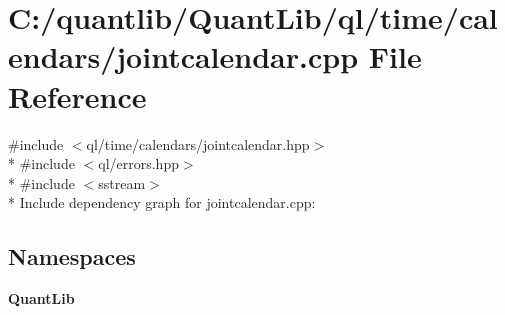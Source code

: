 \section{C\+:/quantlib/\+Quant\+Lib/ql/time/calendars/jointcalendar.cpp File Reference}
\label{jointcalendar_8cpp}
{\ttfamily \#include $<$ql/time/calendars/jointcalendar.\+hpp$>$}\\*
{\ttfamily \#include $<$ql/errors.\+hpp$>$}\\*
{\ttfamily \#include $<$sstream$>$}\\*
Include dependency graph for jointcalendar.\+cpp\+:
\subsection*{Namespaces}
\begin{DoxyCompactItemize}
\item 
 {\bf Quant\+Lib}
\end{DoxyCompactItemize}
